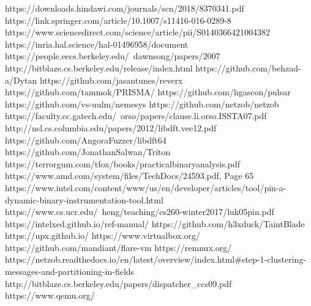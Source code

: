\documentclass[conference]{IEEEtran}
\begin{document}
\begin{thebibliography}{00}
     https://downloads.hindawi.com/journals/scn/2018/8370341.pdf
     https://link.springer.com/article/10.1007/s11416-016-0289-8
     https://www.sciencedirect.com/science/article/pii/S0140366421004382
     https://inria.hal.science/hal-01496958/document
     https://people.eecs.berkeley.edu/~dawnsong/papers/2007%
     http://bitblaze.cs.berkeley.edu/release/index.html
     https://github.com/behzad-a/Dytan
     https://github.com/jasantunes/reverx
     https://github.com/tammok/PRISMA/
     https://github.com/hgascon/pulsar
     https://github.com/vs-uulm/nemesys
     https://github.com/netzob/netzob
     https://faculty.cc.gatech.edu/~orso/papers/clause.li.orso.ISSTA07.pdf
     http://nsl.cs.columbia.edu/papers/2012/libdft.vee12.pdf
     https://github.com/AngoraFuzzer/libdft64
     https://github.com/JonathanSalwan/Triton
     https://terrorgum.com/tfox/books/practicalbinaryanalysis.pdf
     https://www.amd.com/system/files/TechDocs/24593.pdf, Page 65
     https://www.intel.com/content/www/us/en/developer/articles/tool/pin-a-dynamic-binary-instrumentation-tool.html
     https://www.cs.ucr.edu/~heng/teaching/cs260-winter2017/luk05pin.pdf
     https://intelxed.github.io/ref-manual/
     https://github.com/h3xduck/TaintBlade
     https://upx.github.io/
     https://www.virtualbox.org/
     https://github.com/mandiant/flare-vm
     https://remnux.org/
     https://netzob.readthedocs.io/en/latest/overview/index.html\#step-1-clustering-messages-and-partitioning-in-fields
     http://bitblaze.cs.berkeley.edu/papers/dispatcher\_ccs09.pdf
     https://www.qemu.org/

\end{thebibliography}
\vspace{12pt}
\end{document}
